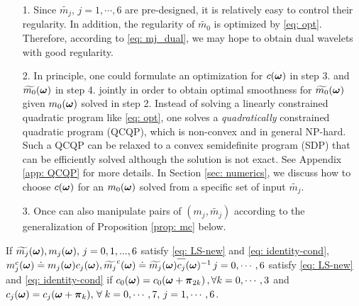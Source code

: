 \begin{itemize}
\item[1.] Since $\widetilde{m_j},\, j=1,\cdots,6$ are pre-designed, it is relatively easy to control their regularity. In addition, the regularity of $\widetilde{m_0}$ is optimized by \eqref{eq: opt}. Therefore, according to \eqref{eq: mj_dual}, we may hope to obtain dual wavelets with good regularity.
\item[2.] In principle, one could formulate an optimization for $c(\boldsymbol{\omega})$ in step 3. and $\widetilde{m_{0}}(\boldsymbol{\omega})$ in step 4. jointly in order to obtain optimal smoothness for $\widetilde{m_{0}}(\boldsymbol{\omega})$ given $m_0(\boldsymbol{\omega})$ solved in step 2. Instead of solving a linearly constrained quadratic program like \eqref{eq: opt}, one solves a {\it quadratically} constrained quadratic program (QCQP), which is non-convex and in general NP-hard. Such a QCQP can be relaxed to a convex semidefinite program (SDP) that can be efficiently solved although the solution is not exact. See Appendix \ref{app: QCQP} for more details. In Section \ref{sec: numerics}, we discuss how to choose $c(\boldsymbol{\omega})$ for an $m_0(\boldsymbol{\omega})$ solved from a specific set of input $\widetilde{m_j}$.
\item[3.] Once can also manipulate pairs of $(m_j,\widetilde{m_j})$ according to the generalization of Proposition \ref{prop: mc} below.
\end{itemize}
\begin{proposition}\label{prop: mjc}
If $\widetilde{m_{j}}(\boldsymbol{\omega}), m_j(\boldsymbol{\omega}),\,  j = 0,1,...,6$ satisfy \eqref{eq: LS-new} and \eqref{eq: identity-cond}, 
$m_j^c(\V{\omega})\doteq m_j(\V{\omega})c_j(\V{\omega}), \widetilde{m_j}^c(\V{\omega})\doteq \m{j}\overlinespace{c_j}(\V{\omega})^{-1} \, j = 0,\cdots,6$ 
satisfy \eqref{eq: LS-new} and \eqref{eq: identity-cond} if $ c_0(\boldsymbol{\omega}) = c_0(\boldsymbol{\omega}+\boldsymbol{\pi}_{2k})\,,\forall k = 0,\cdots,3$ and $c_j(\boldsymbol{\omega}) = c_j(\boldsymbol{\omega} + \boldsymbol{\pi}_k),\, \forall \;k = 0,\cdots,7,\, j = 1,\cdots,6$.
\end{proposition}

